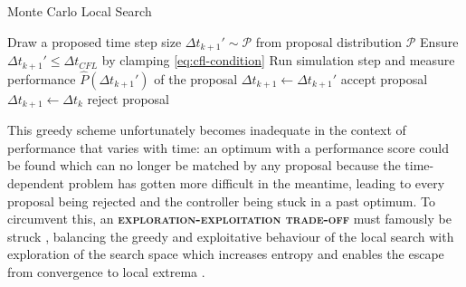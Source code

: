 \documentclass[oneside, a4paper]{book}
\newcommand\emphasis[1]{{\scshape\bfseries#1}}
\newcommand\br[1]{\left(#1\right)}
\begin{document}
    \begin{algorithm}
      \caption{Monte Carlo Local Search}
      \label{alg:local-search}
      \begin{algorithmic}[1]
          \State Draw a proposed time step size $\Delta t_{k+1}' \sim \mathcal{P}$ from proposal distribution $\mathcal{P}$ 
          \State Ensure $\Delta t_{k+1}' \leq \Delta t_{CFL}$ by clamping \Comment\autoref{eq:cfl-condition}
          \State Run simulation step and measure performance $\hat{P}\br{\Delta t_{k+1}'}$ of the proposal
          \If{$\hat{P}\br{\Delta t_{k+1}'} > \hat{P}\br{\Delta t_k}$} 
            \State $\Delta t_{k+1} \gets \Delta t_{k+1}'$ \Comment accept proposal
          \Else
            \State $\Delta t_{k+1} \gets \Delta t_{k}$ \Comment reject proposal
          \EndIf 
        \EndFor
      
      \end{algorithmic}
    \end{algorithm}


    This greedy scheme unfortunately becomes inadequate in the context of performance that varies with time: an optimum with a performance score could be found which can no longer be matched by any proposal because the time-dependent problem has gotten more difficult in the meantime, leading to every proposal being rejected and the controller being stuck in a past optimum. To circumvent this, an \emphasis{exploration-exploitation trade-off} must famously be struck \autocite{bbo-bayesian-phd}, balancing the greedy and exploitative behaviour of the local search with exploration of the search space which increases entropy and enables the escape from convergence to local extrema \autocite{simulated-annealing}.
    
\end{document}
